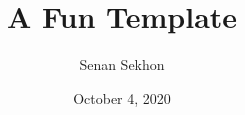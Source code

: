 \documentclass{extarticle}
\begin{document}
\titlespacing*{\section}{0pt}{5pt}{5pt}
\titlespacing*{\subsection}{0pt}{5pt}{5pt}
\titlespacing*{\subsubsection}{0pt}{5pt}{5pt}


\newcommand{\Disp}{\displaystyle}
\newcommand{\qe}{\hfill\(\bigtriangledown\)}
\DeclareMathAlphabet{}
\setlength{\parindent}{0.2in}
\setlength{\parskip}{0pt}
\setlength{\columnseprule}{0pt}

\title{\huge\sffamily\bfseries A Fun Template}
\author{\Large\sffamily Senan Sekhon}
\date{\sffamily October 4, 2020}
\end{document}
